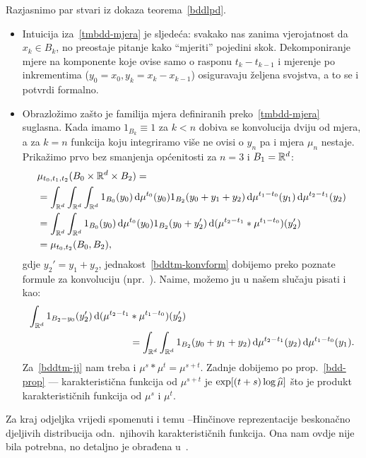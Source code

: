 \documentclass[main.tex]{subfiles}
\begin{document}
\begin{komentar} \label{tmbdd-komentar}
	Razjasnimo par stvari iz dokaza teorema~\ref{bddlpd}.
	\begin{itemize}
		\item Intuicija iza~\eqref{tmbdd-mjera} je sljedeća: svakako nas zanima
		      vjerojatnost da \( x_k \in B_k \), no preostaje pitanje kako \enquote{mjeriti} pojedini skok.
		      Dekomponiranje mjere na komponente koje ovise samo o rasponu \( t_k-t_{k-1} \) i mjerenje po
		      inkrementima (\( y_0=x_0, y_k = x_k-x_{k-1} \)) osiguravaju željena svojstva, a to se i
		      potvrdi formalno.

		\item Obrazložimo zašto je familija mjera definiranih preko~\eqref{tmbdd-mjera} suglasna.
		      Kada imamo \( 1_{B_k} \equiv 1 \) za \( k < n \) dobiva se konvolucija dviju od mjera, a za \( k = n \)
		      funkcija koju integriramo više ne ovisi o \( y_n \) pa i mjera \( \mu_n \) nestaje. Prikažimo prvo bez smanjenja općenitosti za \( n = 3 \) i \( B_1 = \mathbb{R}^d \):
		      \begin{align}
			       & \mu_{t_0, t_1, t_2}(B_0 \times \mathbb{R}^d \times B_2) =                                                                                         \\
			       & = \int_{\mathbb{R}^d}\int_{\mathbb{R}^d}\int_{\mathbb{R}^d} 1_{B_0}(y_0) \,\mathrm d \mu^{t_0} (y_0) 1_{B_2}(y_0+y_1+y_2) \,\mathrm d \mu^{t_1-t_0}(y_1) \,\mathrm d \mu^{t_2-t_1}(y_2)      \\
			       & = \int_{\mathbb{R}^d} \int_{\mathbb{R}^d} 1_{B_0}(y_0) \,\mathrm d \mu^{t_0}(y_0) 1_{B_2}(y_0+y_2') \,\mathrm d (\mu^{t_2-t_1}*\mu^{t_1-t_0})(y_2')  \label{bddtm-konvform} \\
			       & = \mu_{t_0, t_2}(B_0, B_2) \label{bddtm-jj},
		      \end{align}
		      gdje \( y_2' = y_1 + y_2 \), jednakost~\eqref{bddtm-konvform} dobijemo preko poznate formule za konvoluciju (npr.~\cite[,~(6)]{sarapa}). Naime, možemo ju u našem slučaju pisati
		      i kao:
		      \begin{equation}
			      \begin{aligned}
				      \int_{\mathbb{R}^d} 1_{B_2-y_0} (y_2')\,\mathrm d (\mu^{t_2-t_1} & * \mu^{t_1-t_0})(y_2')                                                                       \\
				                                                      & =  \int_{\mathbb{R}^d} \int_{\mathbb{R}^d} 1_{B_2}(y_0+y_1+y_2) \,\mathrm d \mu^{t_2-t_1}(y_2) \,\mathrm d \mu^{t_1-t_0}(y_1).
			      \end{aligned}
		      \end{equation}
		      Za~\eqref{bddtm-jj} nam treba i \( \mu^s * \mu^t = \mu^{s+t} \). Zadnje dobijemo po prop.~\ref{bdd-prop} --- karakteristična funkcija od
		      \( \mu^{s+t} \) je \( \exp[(t+s) \log \widehat{\mu}] \) što je produkt karakterističnih funkcija od \( \mu^s \) i \( \mu^t \).
	\end{itemize}
\end{komentar}

Za kraj odjeljka vrijedi spomenuti i temu \levy --Hinčinove reprezentacije beskonačno djeljivih distribucija odn.\
njihovih karakterističnih funkcija. Ona nam ovdje nije bila potrebna, no detaljno je
obrađena u~\cite[\textsection 8]{sato}.
\end{document}
